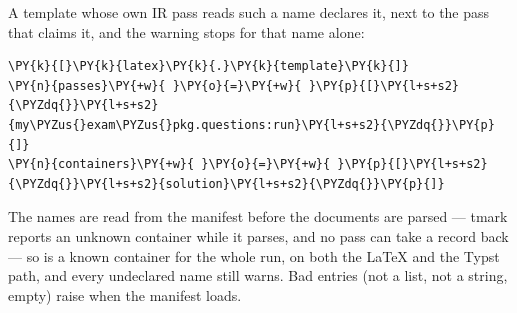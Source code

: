 \documentclass[a4paper,twoside]{article}
\begin{document}
A template whose own IR pass reads such a name declares it, next to the pass
that claims it, and the warning stops for that name alone:
\begin{tscode}[lang=toml, engine=pygments]
\begin{Verbatim}[commandchars=\\\{\},breaklines, breakanywhere, commandchars=\\\{\}]
\PY{k}{[}\PY{k}{latex}\PY{k}{.}\PY{k}{template}\PY{k}{]}
\PY{n}{passes}\PY{+w}{ }\PY{o}{=}\PY{+w}{ }\PY{p}{[}\PY{l+s+s2}{\PYZdq{}}\PY{l+s+s2}{my\PYZus{}exam\PYZus{}pkg.questions:run}\PY{l+s+s2}{\PYZdq{}}\PY{p}{]}
\PY{n}{containers}\PY{+w}{ }\PY{o}{=}\PY{+w}{ }\PY{p}{[}\PY{l+s+s2}{\PYZdq{}}\PY{l+s+s2}{solution}\PY{l+s+s2}{\PYZdq{}}\PY{p}{]}
\end{Verbatim}
\end{tscode}
The names are read from the manifest before the documents are parsed --- tmark
reports an unknown container while it parses, and no pass can take a record
back --- so  is a known container for the whole run, on both the
\LaTeX{} and the Typst path, and every undeclared name still warns. Bad entries
(not a list, not a string, empty) raise  when the manifest
loads.
\end{document}
